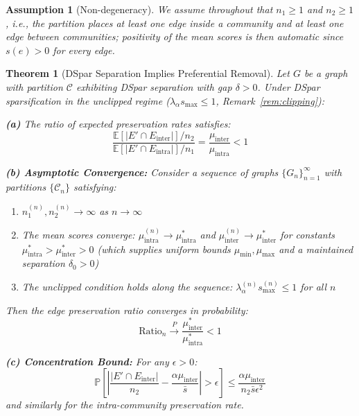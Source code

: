 \documentclass[10pt,journal,compsoc]{IEEEtran}
\newtheorem{theorem}{Theorem}
\newtheorem{assumption}{Assumption}
\begin{document}
\begin{assumption}[Non-degeneracy]
\label{ass:nondegen}
We assume throughout that $n_1 \geq 1$ and $n_2 \geq 1$, i.e., the partition places at least one edge inside a community and at least one edge between communities; positivity of the mean scores is then automatic since $s(e) > 0$ for every edge.
\end{assumption}

\begin{theorem}[DSpar Separation Implies Preferential Removal]
\label{thm:ratio}
Let $G$ be a graph with partition $\mathcal{C}$ exhibiting DSpar separation with gap $\delta > 0$. Under DSpar sparsification in the unclipped regime ($\lambda_\alpha s_{\max} \le 1$, Remark~\ref{rem:clipping}):

\textbf{(a)} The ratio of expected preservation rates satisfies:
\begin{equation}
\frac{\mathbb{E}[|E' \cap E_{\text{inter}}|] / n_2}{\mathbb{E}[|E' \cap E_{\text{intra}}|] / n_1} = \frac{\mu_{\text{inter}}}{\mu_{\text{intra}}} < 1
\end{equation}

\textbf{(b) Asymptotic Convergence:} Consider a sequence of graphs $\{G_n\}_{n=1}^\infty$ with partitions $\{\mathcal{C}_n\}$ satisfying:
\begin{enumerate}
    \item[(i)] $n_1^{(n)}, n_2^{(n)} \to \infty$ as $n \to \infty$
    \item[(ii)] The mean scores converge: $\mu_{\text{intra}}^{(n)} \to \mu_{\text{intra}}^*$ and $\mu_{\text{inter}}^{(n)} \to \mu_{\text{inter}}^*$ for constants $\mu_{\text{intra}}^* > \mu_{\text{inter}}^* > 0$ (which supplies uniform bounds $\mu_{\min}, \mu_{\max}$ and a maintained separation $\delta_0 > 0$)
    \item[(iii)] The unclipped condition holds along the sequence: $\lambda_\alpha^{(n)} s_{\max}^{(n)} \le 1$ for all $n$
\end{enumerate}
Then the edge preservation ratio converges in probability:
\begin{equation}
\text{Ratio}_n \xrightarrow{P} \frac{\mu_{\text{inter}}^*}{\mu_{\text{intra}}^*} < 1
\end{equation}

\textbf{(c) Concentration Bound:} For any $\epsilon > 0$:
\begin{equation}
\mathbb{P}\left[ \left| \frac{|E' \cap E_{\text{inter}}|}{n_2} - \frac{\alpha \mu_{\text{inter}}}{\bar{s}} \right| > \epsilon \right] \leq \frac{\alpha \mu_{\text{inter}}}{n_2 \bar{s} \epsilon^2}
\end{equation}
and similarly for the intra-community preservation rate.
\end{theorem}
\end{document}
